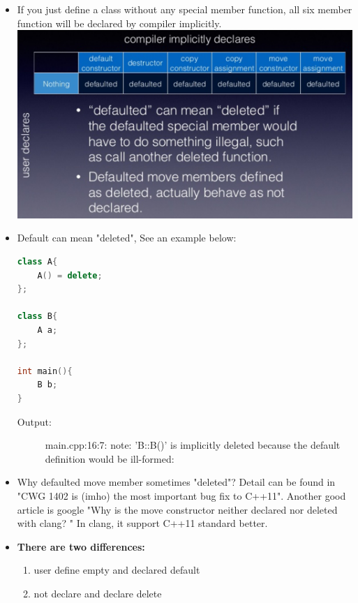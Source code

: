 \documentclass[a4paper,11pt,twoside]{book}
\begin{document}
\begin{itemize}
\item If you just define a class without any special member function, all six member function will be declared by compiler implicitly. \\
\includegraphics[scale=0.6]{pics/sm2.png} \newline


\item Default can mean "deleted", See an example below:

\begin{lstlisting}[frame=single, language=c++]
class A{
	A() = delete;
};

class B{
	A a;
};

int main(){
	B b;
}
\end{lstlisting}
\begin{description}
	\item[Output:] main.cpp:16:7: note: 'B::B()' is implicitly deleted because the default definition would be ill-formed:
\end{description}

\item Why defaulted move member sometimes "deleted"? Detail can be found in "CWG 1402 is (imho) the most important bug fix to C++11". Another good article is google "Why is the move constructor neither declared nor deleted with clang? " In clang, it support C++11 standard better. 

\item \textbf{There are two differences:}
\begin{enumerate}
	\item user define empty and declared default
	\item not declare and declare delete
\end{enumerate}



\end{itemize}
\end{document}
